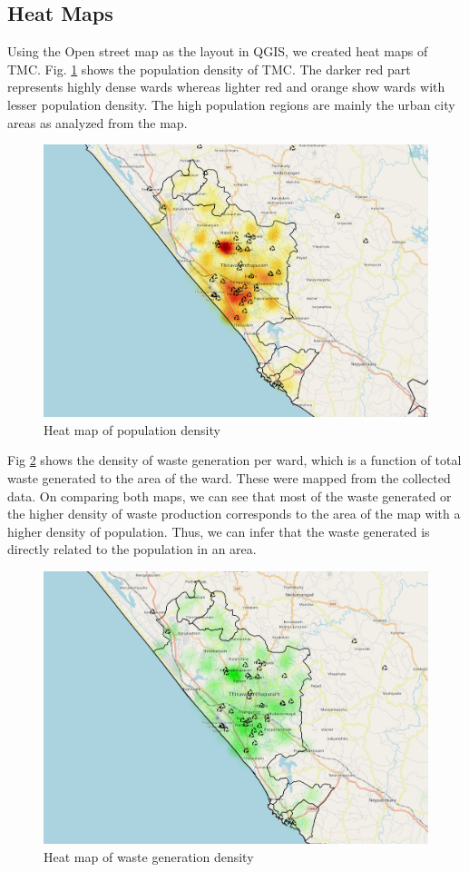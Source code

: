 \documentclass[12pt,a4paper]{report}
\begin{document}
\subsection{Heat Maps}
Using the Open street map as the layout in QGIS, we created heat maps of TMC. Fig. \ref{fig:popdens} shows the population density of TMC. The darker red part represents highly dense wards whereas lighter red and orange show wards with lesser population density. The high population regions are mainly the urban city areas as analyzed from the map. 

\begin{figure}[H]
	\centering
	\includegraphics[width=0.6\linewidth]{popdens}
	\caption{Heat map of population density}
	\label{fig:popdens}
\end{figure}

Fig \ref{fig:wastedens} shows the density of waste generation per ward, which is a function of total waste generated to the area of the ward. These were mapped from the collected data. On comparing both maps, we can see that most of the waste generated or the higher density of waste production corresponds to the area of the map with a higher density of population. Thus, we can infer that the waste generated is directly related to the population in an area.

\begin{figure}[H]
	\centering
	\includegraphics[width=0.6\linewidth]{wastedens}
	\caption{Heat map of waste generation density}
	\label{fig:wastedens}
\end{figure}
\end{document}
